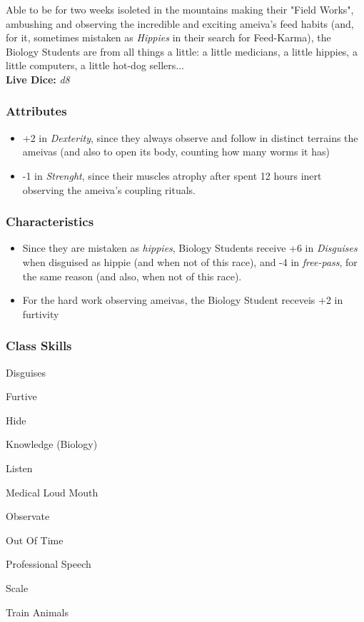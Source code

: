 \documentclass[ letterpaper,12pt]{article}
\begin{document}
Able to be for two weeks isoleted in the mountains making their "Field Works",
ambushing and observing the incredible and exciting ameiva's feed habits (and,
for it, sometimes mistaken as {\it Hippies} in their search for Feed-Karma),
the Biology Students are from all things a little: a little medicians, a little
hippies, a little computers, a little hot-dog sellers...\\

{\bf Live Dice:} {\it d8}

\subsubsection{Attributes}
\begin{itemize}
\item{+2 in {\it Dexterity}, since they always observe and follow in distinct terrains the ameivas (and also to open its body, counting how many worms it has)}
\item{-1 in {\it Strenght}, since their muscles atrophy after spent 12 hours inert observing the ameiva's coupling rituals.}
\end{itemize}

\subsubsection{Characteristics}
\begin{itemize}
\item{Since they are mistaken as {\it hippies}, Biology Students receive +6 in {\it Disguises} when disguised as hippie (and when not of this race), and -4 in {\it free-pass}, for the same reason (and also, when not of this race).}
\item{For the hard work observing ameivas, the Biology Student receveis +2 in {furtivity}}
\end{itemize}

\subsubsection{Class Skills}
\begin{itemize}
{\it 
\item{Disguises}
\item{Furtive}
\item{Hide}
\item{Knowledge (Biology)}
\item{Listen}
\item{Medical Loud Mouth}
\item{Observate}
\item{Out Of Time}
\item{Professional Speech}
\item{Scale}
\item{Train Animals}
}
\end{itemize}
\end{document}
